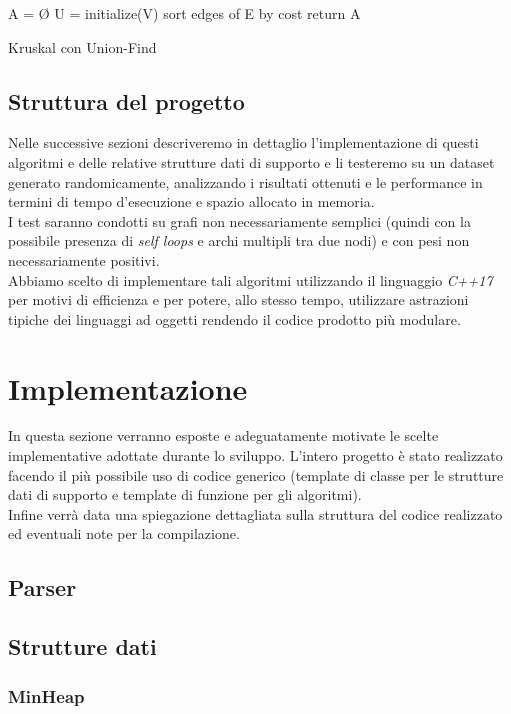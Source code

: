 \documentclass[]{article}
\begin{document}
\begin{algorithm}[H]
	\SetAlgoLined
	\DontPrintSemicolon
	A = Ø\;
	U = initialize(V)\;
	sort edges of E by cost\;
	return A\;
	\caption{Kruskal con Union-Find}
\end{algorithm}
\subsection{Struttura del progetto}
Nelle successive sezioni descriveremo in dettaglio l'implementazione di questi algoritmi e delle relative strutture dati di supporto e li testeremo su un dataset generato randomicamente, analizzando i risultati ottenuti e le performance in termini di tempo d'esecuzione e spazio allocato in memoria.\\
I test saranno condotti su grafi non necessariamente semplici (quindi con la possibile presenza di \textit{self loops} e archi multipli tra due nodi) e con pesi non necessariamente positivi.\\
Abbiamo scelto di implementare tali algoritmi utilizzando il linguaggio \textit{C++17} per motivi di efficienza e per potere, allo stesso tempo, utilizzare astrazioni tipiche dei linguaggi ad oggetti rendendo il codice prodotto più modulare.
\section{Implementazione}
In questa sezione verranno esposte e adeguatamente motivate le scelte implementative adottate durante lo sviluppo. L'intero progetto è stato realizzato facendo il più possibile uso di codice generico (template di classe per le strutture dati di supporto e template di funzione per gli algoritmi).\\
Infine verrà data una spiegazione dettagliata sulla struttura del codice realizzato ed eventuali note per la compilazione.
\subsection{Parser}
\subsection{Strutture dati}
\subsubsection{MinHeap}
\end{document}
